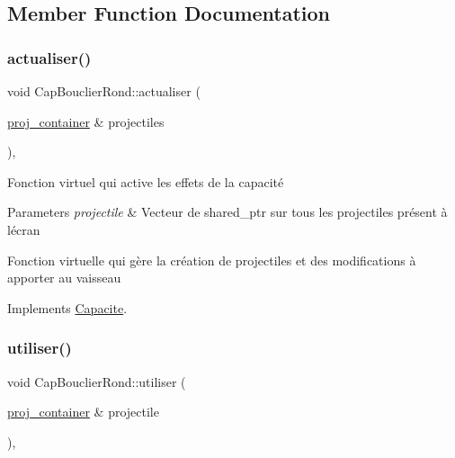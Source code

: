 \subsection{Member Function Documentation}
\mbox{\label{class_cap_bouclier_rond_ab664fc0b17a849d606d1a1085f2095c8}} 
\subsubsection{\texorpdfstring{actualiser()}{actualiser()}}
{\footnotesize\ttfamily void Cap\+Bouclier\+Rond\+::actualiser (\begin{DoxyParamCaption}\item[{\mbox{\hyperlink{def__type_8h_a87980cd8ee9533e561a73e8bbc728188}{proj\+\_\+container}} \&}]{projectiles }\end{DoxyParamCaption})\hspace{0.3cm}{\ttfamily [override]}, {\ttfamily [virtual]}}



Fonction virtuel qui active les effets de la capacité 


\begin{DoxyParams}{Parameters}
{\em projectile} & Vecteur de shared\+\_\+ptr sur tous les projectiles présent à l\textquotesingle{}écran\\
\hline
\end{DoxyParams}
Fonction virtuelle qui gère la création de projectiles et des modifications à apporter au vaisseau 

Implements \mbox{\hyperlink{class_capacite_a85355aeb1d4acc049ed97da177acbd5f}{Capacite}}.

\mbox{\label{class_cap_bouclier_rond_ae420337d3d5c5ec2e5a4a0cafa8f69ad}} 
\subsubsection{\texorpdfstring{utiliser()}{utiliser()}}
{\footnotesize\ttfamily void Cap\+Bouclier\+Rond\+::utiliser (\begin{DoxyParamCaption}\item[{\mbox{\hyperlink{def__type_8h_a87980cd8ee9533e561a73e8bbc728188}{proj\+\_\+container}} \&}]{projectile }\end{DoxyParamCaption})\hspace{0.3cm}{\ttfamily [override]}, {\ttfamily [virtual]}}



